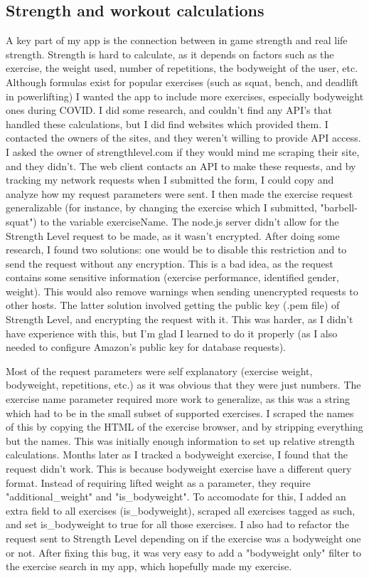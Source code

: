 \documentclass{l4proj}
\begin{document}
\subsection{Strength and workout calculations}
A key part of my app is the connection between in game strength and real life strength. Strength is hard to calculate, as it depends on factors such as the exercise, the weight used, number of repetitions, the bodyweight of the user, etc. Although formulas exist for popular exercises (such as squat, bench, and deadlift in powerlifting) I wanted the app to include more exercises, especially bodyweight ones during COVID. I did some research, and couldn't find any API's that handled these calculations, but I did find websites which provided them. I contacted the owners of the sites, and they weren't willing to provide API access. I asked the owner of strengthlevel.com if they would mind me scraping their site, and they didn't. The web client contacts an API to make these requests, and by tracking my network requests when I submitted the form, I could copy and analyze how my request parameters were sent. I then made the exercise request generalizable (for instance, by changing the exercise which I submitted, "barbell-squat") to the variable exerciseName. The node.js server didn't allow for the Strength Level request to be made, as it wasn't encrypted. After doing some research, I found two solutions: one would be to disable this restriction and to send the request without any encryption. This is a bad idea, as the request contains some sensitive information (exercise performance, identified gender, weight). This would also remove warnings when sending unencrypted requests to other hosts. The latter solution involved getting the public key (.pem file) of Strength Level, and encrypting the request with it. This was harder, as I didn't have experience with this, but I'm glad I learned to do it properly (as I also needed to configure Amazon's public key for database requests).

Most of the request parameters were self explanatory (exercise weight, bodyweight, repetitions, etc.) as it was obvious that they were just numbers. The exercise name parameter required more work to generalize, as this was a string which had to be in the small subset of supported exercises. I scraped the names of this by copying the HTML of the exercise browser, and by stripping everything but the names. This was initially enough information to set up relative strength calculations. Months later as I tracked a bodyweight exercise, I found that the request didn't work. This is because bodyweight exercise have a different query format. Instead of requiring lifted weight as a parameter, they require "additional\_weight" and "is\_bodyweight". To accomodate for this, I added an extra field to all exercises (is\_bodyweight), scraped all exercises tagged as such, and set is\_bodyweight to true for all those exercises. I also had to refactor the request sent to Strength Level depending on if the exercise was a bodyweight one or not. After fixing this bug, it was very easy to add a "bodyweight only" filter to the exercise search in my app, which hopefully made my exercise. 
\end{document}

